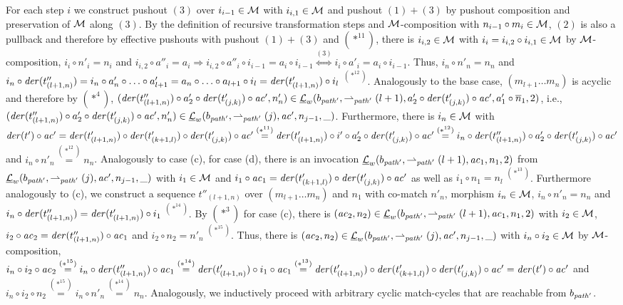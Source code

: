\begin{enumerate}
For each step $i$ we construct pushout $(3)$ over $i_{i-1} \in {\cal M}$ with $i_{i,1} \in {\cal M}$ and pushout $(1)+(3)$ by pushout composition and preservation of ${\cal M}$ along $(3)$.
By the definition of recursive transformation steps and ${\cal M}$-composition with $n_{i-1} \circ m_i \in {\cal M}$, $(2)$ is also a pullback and therefore by effective pushouts with pushout $(1)+(3)$ and $(*^{11})$, there is $i_{i,2} \in {\cal M}$ with $i_i=i_{i,2} \circ i_{i,1} \in {\cal M}$ by ${\cal M}$-composition, $i_i \circ n'_i=n_i$ and $i_{i,2} \circ a''_i=a_i \Rightarrow i_{i,2} \circ a''_i \circ i_{i-1}=a_i \circ i_{i-1} \stackrel{(3)}{\Leftrightarrow} i_i \circ a'_i=a_i \circ i_{i-1}$.
Thus, $i_n \circ n'_n=n_n$ and $i_n \circ \mathit{der}(t''_{(l+1,n)})=i_n \circ a'_n \circ \ldots \circ a'_{l+1}=a_n \circ \ldots \circ a_{l+1} \circ i_l=\mathit{der}(t'_{(l+1,n)}) \circ i_l$ $^{(*^{12})}$.
Analogously to the base case, $(m_{l+1}\ldots m_n)$ is acyclic and therefore by $(*^4)$, $(\mathit{der}(t''_{(l+1,n)}) \circ a'_2 \circ \mathit{der}(t'_{(j,k)}) \circ \mathit{ac}',n'_n) \in \underline{\mathcal{L}}_w(b_{\mathit{path}'},\rightharpoonup_{\mathit{path}'}(l+1),a'_2 \circ \mathit{der}(t'_{(j,k)}) \circ \mathit{ac}',a'_1 \circ \overline{n}_1,2)$, i.e., $(\mathit{der}(t''_{(l+1,n)}) \circ a'_2 \circ \mathit{der}(t'_{(j,k)}) \circ \mathit{ac}',n'_n) \in \underline{\mathcal{L}}_w(b_{\mathit{path}'},\rightharpoonup_{\mathit{path}'}(j),\mathit{ac}',n_{j-1},\_)$.
Furthermore, there is $i_n \in {\cal M}$ with $\mathit{der}(t') \circ \mathit{ac}'=\mathit{der}(t'_{(l+1,n)}) \circ \mathit{der}(t'_{(k+1,l)}) \circ \mathit{der}(t'_{(j,k)}) \circ \mathit{ac}' \stackrel{(*^{11})}{=} \mathit{der}(t'_{(l+1,n)}) \circ i' \circ a'_2 \circ \mathit{der}(t'_{(j,k)}) \circ \mathit{ac}' \stackrel{(*^{12})}{=} i_n \circ \mathit{der}(t''_{(l+1,n)}) \circ a'_2 \circ \mathit{der}(t'_{(j,k)}) \circ \mathit{ac}'$ and $i_n \circ n'_n \stackrel{(*^{12})}{=} n_n$.
Analogously to case (c), for case (d), there is an invocation $\underline{\mathcal{L}}_w(b_{\mathit{path}'},\rightharpoonup_{\mathit{path}'}(l+1),\mathit{ac}_1,n_1,2)$ from $\underline{\mathcal{L}}_w(b_{\mathit{path}'},\rightharpoonup_{\mathit{path}'}(j),\mathit{ac}',n_{j-1},\_)$ with $i_1 \in {\cal M}$ and $i_1 \circ \mathit{ac}_1=\mathit{der}(t'_{(k+1,l)}) \circ \mathit{der}(t'_{(j,k)}) \circ \mathit{ac}'$ as well as $i_1 \circ n_1=n_l$ $^{(*^{13})}$.
Furthermore analogously to (c), we construct a sequence $t''_{(l+1,n)}$ over $(m_{l+1}\ldots m_n)$ and $n_1$ with co-match $n'_n$, morphism $i_n \in {\cal M}$, $i_n \circ n'_n=n_n$ and $i_n \circ \mathit{der}(t''_{(l+1,n)})=\mathit{der}(t'_{(l+1,n)}) \circ i_1$ $^{(*^{14})}$.
By $(*^3)$ for case (c), there is $(\mathit{ac}_2,n_2) \in \underline{\mathcal{L}}_w(b_{\mathit{path}'},\rightharpoonup_{\mathit{path}'}(l+1),\mathit{ac}_1,n_1,2)$ with $i_2 \in {\cal M}$, $i_2 \circ \mathit{ac}_2=\mathit{der}(t''_{(l+1,n)}) \circ \mathit{ac}_1$ and $i_2 \circ n_2=n'_n$ $^{(*^{15})}$.
Thus, there is $(\mathit{ac}_2,n_2) \in \underline{\mathcal{L}}_w(b_{\mathit{path}'},\rightharpoonup_{\mathit{path}'}(j),\mathit{ac}',n_{j-1},\_)$ with $i_n \circ i_2 \in {\cal M}$ by ${\cal M}$-composition, $i_n \circ i_2 \circ \mathit{ac}_2 \stackrel{(*^{15})}{=} i_n \circ \mathit{der}(t''_{(l+1,n)}) \circ \mathit{ac}_1 \stackrel{(*^{14})}{=} \mathit{der}(t'_{(l+1,n)}) \circ i_1 \circ \mathit{ac}_1 \stackrel{(*^{13})}{=} \mathit{der}(t'_{(l+1,n)}) \circ \mathit{der}(t'_{(k+1,l)}) \circ \mathit{der}(t'_{(j,k)}) \circ \mathit{ac}'=\mathit{der}(t') \circ \mathit{ac}'$ and $i_n \circ i_2 \circ n_2 \stackrel{(*^{15})}{=} i_n \circ n'_n \stackrel{(*^{14})}{=} n_n$.
Analogously, we inductively proceed with arbitrary cyclic match-cycles that are reachable from $b_{\mathit{path}'}$.
\end{enumerate}
